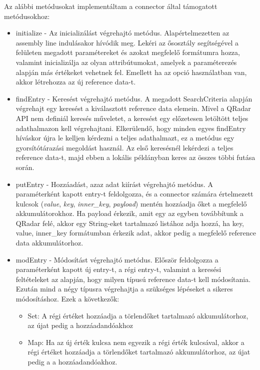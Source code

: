 Az alábbi metódusokat implementáltam a connector által támogatott metódusokhoz:

\begin{itemize}
	\item initialize - Az inicializálást végrehajtó metódus. Alapértelmezetten az assembly line indulásakor hívódik meg. Lekéri az ősosztály segítségével a felületen megadott paramétereket és azokat megfelelő formátumra hozza, valamint inicializálja az olyan attribútumokat, amelyek a paraméterezés alapján más értékeket vehetnek fel. Emellett ha az opció használatban van, akkor létrehozza az új reference data-t.
	
	\item findEntry - Keresést végrehajtó metódus. A megadott SearchCriteria alapján végrehajt egy keresést a kiválasztott reference data elemein. Mivel a QRadar API nem definiál keresés műveletet, a keresést egy előzetesen letöltött teljes adathalmazon kell végrehajtani. Elkerülendő, hogy minden egyes findEntry híváskor újra le kelljen kérdezni a teljes adathalmazt, ez a metódus egy gyorsítótárazási megoldást használ. Az első keresésnél lekérdezi a teljes reference data-t, majd ebben a lokális példányban keres az összes többi futása során. 
	
	\item  putEntry - Hozzáadást, azaz adat kiírást végrehajtó metódus. A paraméterként kapott entry-t feldolgozza, és a connector számára értelmezett kulcsok (\textit{value}, \textit{key}, \textit{inner\_key}, \textit{payload}) mentén hozzáadja őket a megfelelő akkumulátorokhoz. Ha payload érkezik, amit egy az egyben továbbítunk a QRadar felé, akkor egy String-eket tartalmazó listához adja hozzá, ha key, value, inner\_key formátumban érkezik adat, akkor pedig a megfelelő reference data akkumulátorhoz.
	
	\item modEntry - Módosítást végrehajtó metódus. Először feldolgozza a paraméterként kapott új entry-t, a régi entry-t, valamint a keresési feltételeket az alapján, hogy milyen típusú reference data-t kell módosítania. Ezután mind a négy típusra végrehajtja a szükséges lépéseket a sikeres módosításhoz. Ezek a következők:
	\begin{itemize}
		\item Set: A régi értéket hozzáadja a törlendőket tartalmazó akkumulátorhoz, az újat pedig a hozzáadandóakhoz
		
		\item Map: Ha az új érték kulcsa nem egyezik a régi érték kulcsával, akkor a régi értéket hozzáadja a törlendőket tartalmazó akkumulátorhoz, az újat pedig a a hozzáadandóakhoz.
		

\end{itemize}
\end{itemize}

